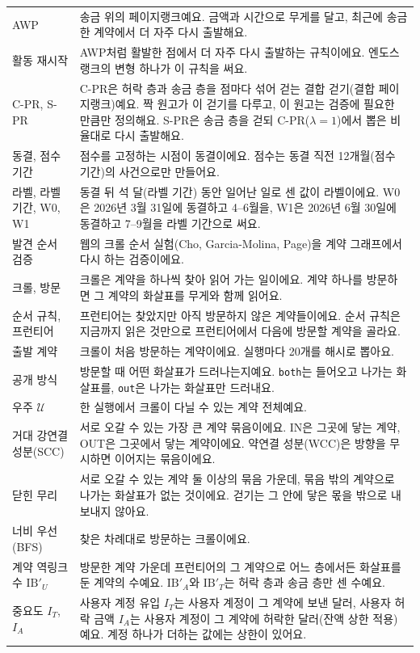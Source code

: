 \documentclass[11pt]{article}
\newcommand{\Univ}{\mathcal{U}}
\newcommand{\IB}{\mathrm{IB}}
\begin{document}
{\begin{longtable}{@{}L{3.6cm}L{11.9cm}@{}}
AWP & 송금 위의 페이지랭크예요. 금액과 시간으로 무게를 달고, 최근에 송금한 계약에서 더 자주 다시 출발해요. \\
활동 재시작 & AWP처럼 활발한 점에서 더 자주 다시 출발하는 규칙이에요. 엔도스랭크의 변형 하나가 이 규칙을 써요. \\
C-PR, S-PR & C-PR은 허락 층과 송금 층을 점마다 섞어 걷는 결합 걷기(결합 페이지랭크)예요. 짝 원고가 이 걷기를 다루고, 이 원고는 검증에 필요한 만큼만 정의해요. S-PR은 송금 층을 걷되 C-PR($\lambda{=}1$)에서 뽑은 비율대로 다시 출발해요. \\
동결, 점수 기간 & 점수를 고정하는 시점이 동결이에요. 점수는 동결 직전 12개월(점수 기간)의 사건으로만 만들어요. \\
라벨, 라벨 기간, W0, W1 & 동결 뒤 석 달(라벨 기간) 동안 일어난 일로 센 값이 라벨이에요. W0은 2026년 3월 31일에 동결하고 4–6월을, W1은 2026년 6월 30일에 동결하고 7–9월을 라벨 기간으로 써요. \\
발견 순서 검증 & 웹의 크롤 순서 실험(Cho, Garcia-Molina, Page)을 계약 그래프에서 다시 하는 검증이에요. \\
크롤, 방문 & 크롤은 계약을 하나씩 찾아 읽어 가는 일이에요. 계약 하나를 방문하면 그 계약의 화살표를 무게와 함께 읽어요. \\
순서 규칙, 프런티어 & 프런티어는 찾았지만 아직 방문하지 않은 계약들이에요. 순서 규칙은 지금까지 읽은 것만으로 프런티어에서 다음에 방문할 계약을 골라요. \\
출발 계약 & 크롤이 처음 방문하는 계약이에요. 실행마다 20개를 해시로 뽑아요. \\
공개 방식 & 방문할 때 어떤 화살표가 드러나는지예요. \texttt{both}는 들어오고 나가는 화살표를, \texttt{out}은 나가는 화살표만 드러내요. \\
우주 $\Univ$ & 한 실행에서 크롤이 다닐 수 있는 계약 전체예요. \\
거대 강연결 성분(SCC) & 서로 오갈 수 있는 가장 큰 계약 묶음이에요. IN은 그곳에 닿는 계약, OUT은 그곳에서 닿는 계약이에요. 약연결 성분(WCC)은 방향을 무시하면 이어지는 묶음이에요. \\
닫힌 무리 & 서로 오갈 수 있는 계약 둘 이상의 묶음 가운데, 묶음 밖의 계약으로 나가는 화살표가 없는 것이에요. 걷기는 그 안에 닿은 몫을 밖으로 내보내지 않아요. \\
너비 우선(BFS) & 찾은 차례대로 방문하는 크롤이에요. \\
계약 역링크 수 $\IB'_U$ & 방문한 계약 가운데 프런티어의 그 계약으로 어느 층에서든 화살표를 둔 계약의 수예요. $\IB'_A$와 $\IB'_T$는 허락 층과 송금 층만 센 수예요. \\
중요도 $I_T$, $I_A$ & 사용자 계정 유입 $I_T$는 사용자 계정이 그 계약에 보낸 달러, 사용자 허락 금액 $I_A$는 사용자 계정이 그 계약에 허락한 달러(잔액 상한 적용)예요. 계정 하나가 더하는 값에는 상한이 있어요. \\

\end{longtable}}
\end{document}
